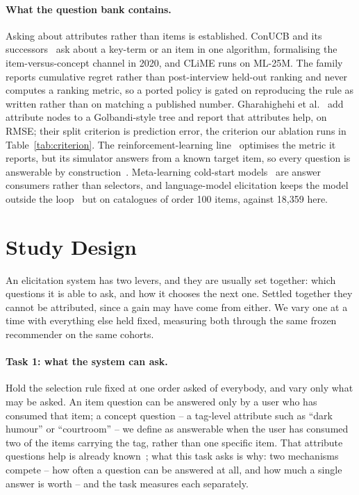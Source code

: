 \documentclass[runningheads]{llncs}
\begin{document}
\paragraph{What the question bank contains.}
Asking about attributes rather than items is established. ConUCB and its
successors~\cite{zhang2020conucb,wang2023conlinucb,liu2025clisk} ask about a key-term or an item in
one algorithm, formalising the item-versus-concept channel in 2020, and CLiME runs on ML-25M. The
family reports cumulative regret rather than post-interview held-out ranking and never computes a
ranking metric, so a ported policy is gated on reproducing the rule as written rather than on
matching a published number. Gharahighehi et al.~\cite{gharahighehi2025pairwise} add attribute nodes
to a Golbandi-style tree and report that attributes help, on RMSE; their split criterion is
prediction error, the criterion our ablation runs in Table~\ref{tab:criterion}. The
reinforcement-learning
line~\cite{sun2018conversational,lei2020estimation,lei2020interactive,deng2021unicorn,li2021seamlessly}
optimises the metric it reports, but its simulator answers from a known target item, so every question
is answerable by construction~\cite{kim2024targetfree,zhang2022minicorn}. Meta-learning cold-start
models~\cite{lee2019melu,lin2021tanp} are answer consumers rather than selectors, and language-model
elicitation keeps the model outside the loop~\cite{austin2024bayesian} but on catalogues of order 100
items, against 18{,}359 here.

\section{Study Design}
\label{sec:contract}

An elicitation system has two levers, and they are usually set together: which questions it is able to
ask, and how it chooses the next one. Settled together they cannot be attributed, since a gain may
have come from either. We vary one at a time with everything else held fixed, measuring both through
the same frozen recommender on the same cohorts.

\paragraph{Task 1: what the system can ask.}
Hold the selection rule fixed at one order asked of everybody, and vary only what may be asked. An item question can be answered only by a user who has consumed that item; a concept question
-- a tag-level attribute such as ``dark humour'' or ``courtroom'' -- we define as answerable when the
user has consumed two of the items carrying the tag, rather than one specific item. That attribute
questions help is already known~\cite{zhang2020conucb,gharahighehi2025pairwise}; what this task asks
is why: two mechanisms compete -- how often a question can be answered at all, and how much a single
answer is worth -- and the task measures each separately.
\end{document}
